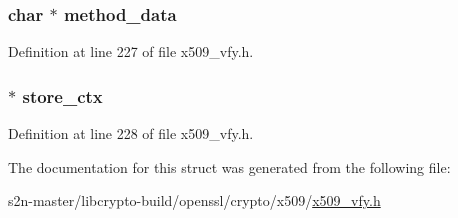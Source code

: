 \subsubsection[{\texorpdfstring{method\+\_\+data}{method_data}}]{\setlength{\rightskip}{0pt plus 5cm}char $\ast$ method\+\_\+data}\hypertarget{structx509__lookup__st_a994ec3b2447e920106a794dde071ce24}{}\label{structx509__lookup__st_a994ec3b2447e920106a794dde071ce24}


Definition at line 227 of file x509\+\_\+vfy.\+h.

\subsubsection[{\texorpdfstring{store\+\_\+ctx}{store_ctx}}]{ $\ast$ store\+\_\+ctx}\hypertarget{structx509__lookup__st_ac02cd78c2c67fc42c895c939d4b332cb}{}\label{structx509__lookup__st_ac02cd78c2c67fc42c895c939d4b332cb}


Definition at line 228 of file x509\+\_\+vfy.\+h.



The documentation for this struct was generated from the following file\+:\begin{DoxyCompactItemize}
\item 
s2n-\/master/libcrypto-\/build/openssl/crypto/x509/\hyperlink{crypto_2x509_2x509__vfy_8h}{x509\+\_\+vfy.\+h}\end{DoxyCompactItemize}
